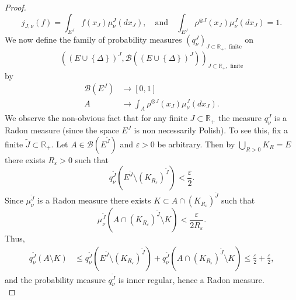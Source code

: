 \documentclass[a4paper,12pt]{article}
\theoremstyle{definition}
\theoremstyle{remark}
\numberwithin{equation}{section}
\numberwithin{theorem}{section}
\begin{document}
\begin{proof}
\[
j_{J,\nu}(f)=\int_{E^{J}}f(x_{J})\mu_{\nu}^{J}(dx_{J}),
\quad \text{and} \quad 
\int_{E^{J}}\rho^{\otimes J}(x_{J})\mu_{\nu}^{J}(dx_{J})=1.
\]
We now define the family of probability measures
$
\left(q_{\nu}^{J}\right)_{J\subset\mathbb{R}_{+},\text{ finite}}
$
 on 
\[
\left(\left(E\cup\left\{ \Delta\right\} \right)^{J},\mathcal{B}(\left(E\cup\left\{ \Delta\right\} \right)^{J})\right)_{J\subset\mathbb{R}_{+},\text{ finite}}
\]
by 
\begin{align*}
\mathcal{B}(E^{J}) & \rightarrow\left[0,1\right]\\
A & \rightarrow\int_{A}\rho^{\otimes J}(x_{J})\mu_{\nu}^{J}(dx_{J}).
\end{align*}
We observe the non-obvious fact that for any finite $J\subset\mathbb{R}_{+}$
the measure $q_{\nu}^{J}$ is a Radon measure (since the space $E^{J}$
is non necessarily Polish). To see this, fix a finite $\tilde{J}\subset\mathbb{R}_{+}$.
Let $A\in\mathcal{B}\left(E^{\tilde{J}}\right)$ and $\varepsilon>0$
be arbitrary. Then by $\underset{R>0}{\bigcup}K_{R}=E$ there exists
$R_{\varepsilon}>0$ such that 
\[
q_{\nu}^{\tilde{J}}\left(E^{\tilde{J}}\setminus\left(K_{R_{\varepsilon}}\right)^{\tilde{J}}\right)<\frac{\varepsilon}{2}.
\]
Since $\mu_{\nu}^{\tilde{J}}$ is a Radon measure there exists $K\subset A\cap\left(K_{R_{\varepsilon}}\right)^{\tilde{J}}$
such that 
\[
\mu_{\nu}^{\tilde{J}}\left(A\cap\left(K_{R_{\varepsilon}}\right)^{\tilde{J}}\setminus K\right)<\frac{\varepsilon}{2R_{\varepsilon}}.
\]
 Thus, 
\begin{align*}
q_{\nu}^{\tilde{J}}\left(A\setminus K\right) & \leq q_{\nu}^{\tilde{J}}\left(E^{\tilde{J}}\setminus\left(K_{R_{\varepsilon}}\right)^{\tilde{J}}\right)+q_{\nu}^{\tilde{J}}\left(A\cap\left(K_{R_{\varepsilon}}\right)^{\tilde{J}}\setminus K\right)\leq\frac{\varepsilon}{2}+\frac{\varepsilon}{2},
\end{align*}
 and the probability measure $q_{\nu}^{\tilde{J}}$ is inner regular,
hence a Radon measure. \\


\end{proof}
\end{document}

